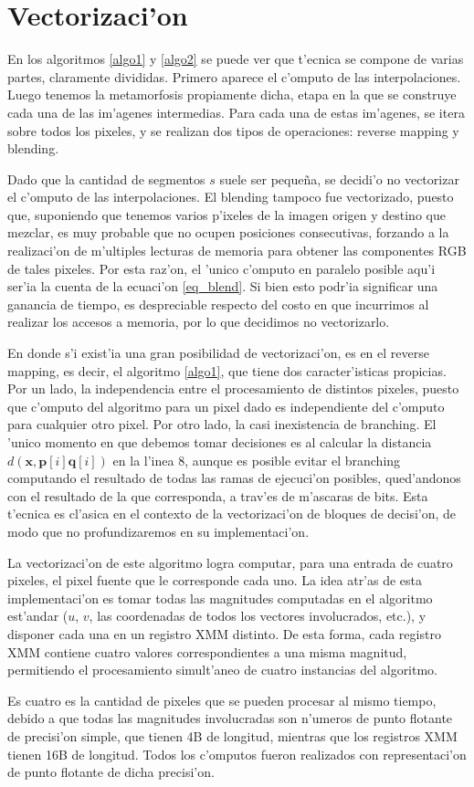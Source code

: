\section{Vectorizaci'on}

En los algoritmos \ref{algo1} y \ref{algo2} se puede ver que t'ecnica se compone de varias partes, claramente divididas. Primero aparece el c'omputo de las interpolaciones. Luego tenemos la metamorfosis propiamente dicha, etapa en la que se construye cada una de las im'agenes intermedias. Para cada una de estas im'agenes, se itera sobre todos los pixeles, y se realizan dos tipos de operaciones: reverse mapping y blending.

Dado que la cantidad de segmentos $s$ suele ser peque\~{n}a, se decidi'o no vectorizar el c'omputo de las interpolaciones. El blending tampoco fue vectorizado, puesto que, suponiendo que tenemos varios p'ixeles de la imagen origen y destino que mezclar, es muy probable que no ocupen posiciones consecutivas, forzando a la realizaci'on de m'ultiples lecturas de memoria para obtener las componentes RGB de tales pixeles. Por esta raz'on, el 'unico c'omputo en paralelo posible aqu'i ser'ia la cuenta de la ecuaci'on \ref{eq_blend}. Si bien esto podr'ia significar una ganancia de tiempo, es despreciable respecto del costo en que incurrimos al realizar los accesos a memoria, por lo que decidimos no vectorizarlo.

En donde s'i exist'ia una gran posibilidad de vectorizaci'on, es en el reverse mapping, es decir, el algoritmo \ref{algo1}, que tiene dos caracter'isticas propicias. Por un lado, la independencia entre el procesamiento de distintos pixeles, puesto que c'omputo del algoritmo  para un pixel dado es independiente del c'omputo para cualquier otro pixel. Por otro lado, la casi inexistencia de branching. El 'unico momento en que debemos tomar decisiones es al calcular la distancia $d(\mathbf{x}, \mathbf{p}[i]\mathbf{q}[i])$ en la l'inea 8, aunque es posible evitar el branching computando el resultado de todas las ramas de ejecuci'on posibles, qued'andonos con el resultado de la que corresponda, a trav'es de m'ascaras de bits. Esta t'ecnica es cl'asica en el contexto de la vectorizaci'on de bloques de decisi'on, de modo que no profundizaremos en su implementaci'on.

La vectorizaci'on de este algoritmo logra computar, para una entrada de cuatro pixeles, el pixel fuente que le corresponde cada uno. La idea atr'as de esta implementaci'on es tomar todas las magnitudes computadas en el algoritmo est'andar ($u$, $v$, las coordenadas de todos los vectores involucrados, etc.), y disponer cada una en un registro XMM distinto. De esta forma, cada registro XMM contiene cuatro valores correspondientes a una misma magnitud, permitiendo el procesamiento simult'aneo de cuatro instancias del algoritmo.

Es cuatro es la cantidad de pixeles que se pueden procesar al mismo tiempo, debido a que todas las magnitudes involucradas son n'umeros de punto flotante de precisi'on simple, que tienen 4B de longitud, mientras que los registros XMM tienen 16B de longitud. Todos los c'omputos fueron realizados con representaci'on de punto flotante de dicha precisi'on.